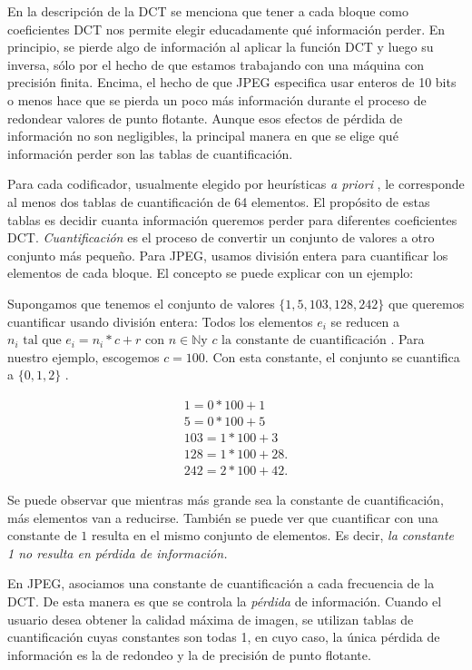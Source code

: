 En la descripción de la DCT se menciona que tener a cada bloque como
coeficientes DCT nos permite elegir educadamente qué información perder. En
principio, se pierde algo de información al aplicar la función DCT y luego su
inversa, sólo por el hecho de que estamos trabajando con una máquina con
precisión finita. Encima, el hecho de que JPEG especifica usar enteros de 10
bits o menos hace que se pierda un poco más información durante el proceso de
redondear valores de punto flotante. Aunque esos efectos de pérdida de
información no son negligibles, la principal manera en que se elige qué
información perder son las tablas de cuantificación.

Para cada codificador, usualmente elegido por heurísticas \emph{ a priori }, le
corresponde al menos dos tablas de cuantificación de 64 elementos. El propósito
de estas tablas es decidir cuanta información queremos perder para diferentes
coeficientes DCT. \emph{Cuantificación} es el proceso de convertir un conjunto
de valores a otro conjunto más pequeño. Para JPEG, usamos división entera para
cuantificar los elementos de cada bloque. El concepto se puede explicar con un
ejemplo:

Supongamos que tenemos el conjunto de valores $ \{ 1, 5, 103, 128, 242 \} $ que
queremos cuantificar usando división entera: Todos los elementos $e_i$ se
reducen a $ n_i \text{ tal que } e_i = n_i * c + r \text{ con } n \in ℕ \text{
y } c \text{ la constante de cuantificación }$. Para nuestro ejemplo, escogemos
$ c = 100 $. Con esta constante, el conjunto se cuantifica a $ \{ 0, 1, 2 \}$ .

\begin{eqnarray*}
    1 = 0 * 100 + 1 \\
    5 = 0 * 100 + 5 \\
    103 = 1 * 100 + 3 \\
    128 = 1 * 100 + 28. \\
    242 = 2 * 100 + 42.
\end{eqnarray*}

Se puede observar que mientras más grande sea la constante de cuantificación,
más elementos van a reducirse. También se puede ver que cuantificar con una
constante de $1$ resulta en el mismo conjunto de elementos. Es decir, \emph{ la constante 1 no resulta en pérdida de información.}

En JPEG, asociamos una constante de cuantificación a cada frecuencia de la DCT.
De esta manera es que se controla la \emph{pérdida} de información. Cuando el
usuario desea obtener la calidad máxima de imagen, se utilizan tablas de
cuantificación cuyas constantes son todas 1, en cuyo caso, la única pérdida de
información es la de redondeo y la de precisión de punto flotante.

